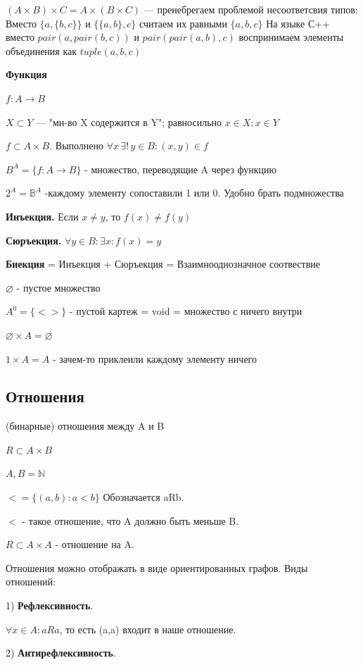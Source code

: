 \documentclass{article}
\begin{document}
$(A \times B) \times C = A \times (B \times C)$ --- пренебрегаем проблемой несоответсвия типов:
Вместо $\{a, \{b, c\}\}$ и $\{\{a, b\}, c\}$ считаем их равными $\{a, b, c\}$
На языке С++ вместо $pair(a, pair(b, c))$  и $pair(pair(a, b), c)$  воспринимаем элементы объединения как $tuple(a, b, c)$

\textbf{Функция} 

$f:A \rightarrow B$

$X \subset Y$ --- "мн-во X содержится в Y"; равносильно $x \in X: x \in Y$

$f \subset A \times B$. Выполнено $\forall x\, \exists!\,y \in B: (x,y) \in f$

$B^A = \{f:A \rightarrow B\}$ - множество, переводящие A через функцию

$2^{A}=\mathbb{B}^{A}$ -каждому элементу сопоставили 1 или 0. Удобно брать подмножества

\textbf{Инъекция.} Если $x \neq y$, то $f(x) \neq f(y)$

\textbf{Сюръекция.} $\forall y \in B: \exists x: f(x)=y$

\textbf{Биекция} = Инъекция + Сюръекция = Взаимнооднозначное соотвествие

$\varnothing$ - пустое множество

$A^0 = \{<>\}$ - пустой картеж = void = множество с ничего внутри

$\varnothing \times A = \varnothing$

$1 \times A = A$ - зачем-то приклеили  каждому элементу ничего

\subsection*{Отношения}

(бинарные) отношения между A и B

$R \subset A \times B$

$A,B = \mathds{N}$

$< = \{(a,b): a<b\}$ Обозначается aRb.

$<$ - такое отношение, что A должно быть меньше B.

$R \subset A \times A$ - отношение на A.

Отношения можно отображать в виде ориентированных графов.
Виды отношений: 

1) \textbf{Рефлексивность}.

$\forall x \in A: aRa$, то есть (a,a) входит в наше отношение.

2) \textbf{Антирефлексивность}.
\end{document}
